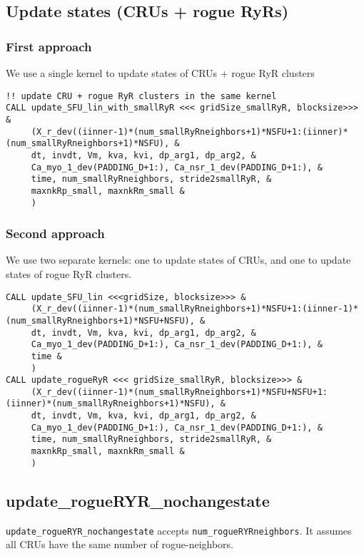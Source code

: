 \subsection{Update states (CRUs + rogue RyRs)}

\subsubsection{First approach}

We use a single kernel to update states of CRUs + rogue RyR clusters
\begin{verbatim}
!! update CRU + rogue RyR clusters in the same kernel
CALL update_SFU_lin_with_smallRyR <<< gridSize_smallRyR, blocksize>>> &
     (X_r_dev((iinner-1)*(num_smallRyRneighbors+1)*NSFU+1:(iinner)*(num_smallRyRneighbors+1)*NSFU), &
     dt, invdt, Vm, kva, kvi, dp_arg1, dp_arg2, &
     Ca_myo_1_dev(PADDING_D+1:), Ca_nsr_1_dev(PADDING_D+1:), &
     time, num_smallRyRneighbors, stride2smallRyR, &
     maxnkRp_small, maxnkRm_small &
     )
\end{verbatim}

\subsubsection{Second approach}

We use two separate kernels: one to update states of CRUs, and one to update
states of rogue RyR clusters.

\begin{verbatim}
CALL update_SFU_lin <<<gridSize, blocksize>>> &
     (X_r_dev((iinner-1)*(num_smallRyRneighbors+1)*NSFU+1:(iinner-1)*(num_smallRyRneighbors+1)*NSFU+NSFU), &
     dt, invdt, Vm, kva, kvi, dp_arg1, dp_arg2, &
     Ca_myo_1_dev(PADDING_D+1:), Ca_nsr_1_dev(PADDING_D+1:), &
     time &
     )
CALL update_rogueRyR <<< gridSize_smallRyR, blocksize>>> &
     (X_r_dev((iinner-1)*(num_smallRyRneighbors+1)*NSFU+NSFU+1:(iinner)*(num_smallRyRneighbors+1)*NSFU), &
     dt, invdt, Vm, kva, kvi, dp_arg1, dp_arg2, &
     Ca_myo_1_dev(PADDING_D+1:), Ca_nsr_1_dev(PADDING_D+1:), &
     time, num_smallRyRneighbors, stride2smallRyR, &
     maxnkRp_small, maxnkRm_small &
     )
\end{verbatim}

\subsection{update\_rogueRYR\_nochangestate}


\verb!update_rogueRYR_nochangestate! accepts \verb!num_rogueRYRneighbors!. It
assumes all CRUs have the same number of rogue-neighbors. 


